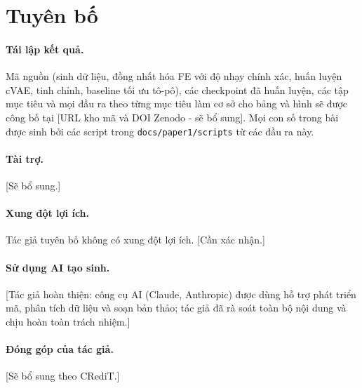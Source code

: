 \documentclass[a4paper,11pt]{article}
\begin{document}
\section*{Tuyên bố}

\paragraph{Tái lập kết quả.}
Mã nguồn (sinh dữ liệu, đồng nhất hóa FE với độ nhạy chính xác, huấn luyện
cVAE, tinh chỉnh, baseline tối ưu tô-pô), các checkpoint đã huấn luyện, các
tập mục tiêu và mọi đầu ra theo từng mục tiêu làm cơ sở cho bảng và hình sẽ
được công bố tại [URL kho mã và DOI Zenodo - sẽ bổ sung]. Mọi con số trong bài
được sinh bởi các script trong \texttt{docs/paper1/scripts} từ các đầu ra này.

\paragraph{Tài trợ.} [Sẽ bổ sung.]

\paragraph{Xung đột lợi ích.} Tác giả tuyên bố không có xung đột lợi ích.
[Cần xác nhận.]

\paragraph{Sử dụng AI tạo sinh.} [Tác giả hoàn thiện: công cụ AI (Claude,
Anthropic) được dùng hỗ trợ phát triển mã, phân tích dữ liệu và soạn bản
thảo; tác giả đã rà soát toàn bộ nội dung và chịu hoàn toàn trách nhiệm.]

\paragraph{Đóng góp của tác giả.} [Sẽ bổ sung theo CRediT.]



\end{document}
